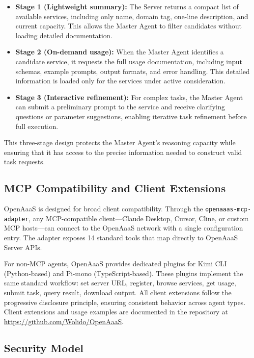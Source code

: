 \documentclass{article}
\begin{document}
\begin{itemize}
\item \textbf{Stage 1 (Lightweight summary):} The Server returns a compact list of available services, including only name, domain tag, one-line description, and current capacity. This allows the Master Agent to filter candidates without loading detailed documentation.
\item \textbf{Stage 2 (On-demand usage):} When the Master Agent identifies a candidate service, it requests the full usage documentation, including input schemas, example prompts, output formats, and error handling. This detailed information is loaded only for the services under active consideration.
\item \textbf{Stage 3 (Interactive refinement):} For complex tasks, the Master Agent can submit a preliminary prompt to the service and receive clarifying questions or parameter suggestions, enabling iterative task refinement before full execution.
\end{itemize}

This three-stage design protects the Master Agent's reasoning capacity while ensuring that it has access to the precise information needed to construct valid task requests.

\subsection{MCP Compatibility and Client Extensions}

OpenAaaS is designed for broad client compatibility. Through the \texttt{openaaas-mcp-adapter}, any MCP-compatible client---Claude Desktop, Cursor, Cline, or custom MCP hosts---can connect to the OpenAaaS network with a single configuration entry. The adapter exposes 14 standard tools that map directly to OpenAaaS Server APIs.

For non-MCP agents, OpenAaaS provides dedicated plugins for Kimi CLI (Python-based) and Pi-mono (TypeScript-based). These plugins implement the same standard workflow: set server URL, register, browse services, get usage, submit task, query result, download output. All client extensions follow the progressive disclosure principle, ensuring consistent behavior across agent types. Client extensions and usage examples are documented in the repository at \url{https://github.com/Wolido/OpenAaaS}.

\subsection{Security Model}
\end{document}
